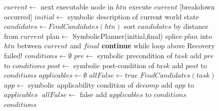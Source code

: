 \documentclass[a4paper,twoside,french]{article}
\begin{document}
		\begin{figure}[t]
		
			\begin{algorithmic}[1]\small
				
				\State $current\gets$ next executable node in $htn$
				 execute $current$
				\Else\hskip 0.1in [breakdown occurred]
				\State $initial\gets$ symbolic description of current world state
				\State $candidates\gets FindCandidates(htn)$
				\State sort $candidates$ by distance from $current$
				\State plan$\gets$ SymbolicPlanner(initial,final)
				\State splice $plan$ into $htn$ between $current$ and $final$
				\State \textbf{continue} while loop above
				\EndIf
				\EndFor
				\State Recovery failed!
				\EndIf
				\EndWhile
				\EndProcedure
				\Statex
				\State $conditions\gets\emptyset$
				\State $pre\gets$ symbolic precondition of $task$
				\State add $pre$ to $conditions$\EndIf
				\State $post\gets$ symbolic post-condition of $task$
				\State add $post$ to $conditions$
				\EndIf
				\State $applicables\gets\emptyset$
				\State $allFalse\gets true$
				 $FindCandidates(task)$
				\EndFor 
				\State $app\gets$ symbolic applicability condition of $decomp$
				 add $app$ to $applicables$\EndIf
				\Else $\;allFalse\gets$ false
				\EndIf 
				\EndIf
				\EndFor
				 add $applicables$ to $conditions$
				\EndIf
				\State\Return $conditions$
				\EndProcedure 
				
			\end{algorithmic}
			\vskip 8pt
		\end{figure} 
\end{document}
